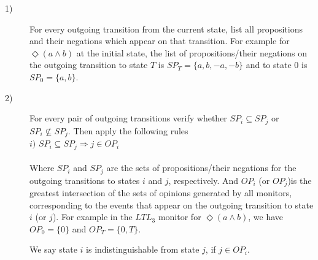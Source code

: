  
 \begin{description}
 
 
 \item[1)] For every outgoing transition from the current state, list all propositions and their negations which appear on that transition. For example for $\Diamond (a \wedge b)$  at the initial state, the list of propositions/their negations on the outgoing transition to state $T$ is $SP_T = \{a, b, -a, -b\}$ and to state $0$ is $SP_0 = \{a, b\}$.
 
 \item[2)] For every pair of outgoing transitions verify whether $SP_i \subseteq SP_j$ or $SP_i \nsubseteq SP_j$. Then apply the following rules\\ 
 
 
$i)$ $SP_i \subseteq SP_j \Longrightarrow  j \in OP_i $  \\ \\
 
 
 Where $SP_i$ and $SP_j$ are the sets of propositions/their negations for the outgoing transitions to states $i$ and $j$, respectively. And $OP_i$ (or $OP_j$)is the greatest intersection of the sets of opinions generated by all monitors, corresponding to the events that appear on the outgoing transition to state $i$ (or $j$). For example in the $LTL_3$ monitor for $\Diamond (a \wedge b)$,  we have $OP_0 = \{ 0 \}$ and $OP_T = \{0, T\}$.

We say state $i$ is indistinguishable from state $j$, if $ j \in OP_i $.
 
 
 
 \end{description}
 
 

\fi
